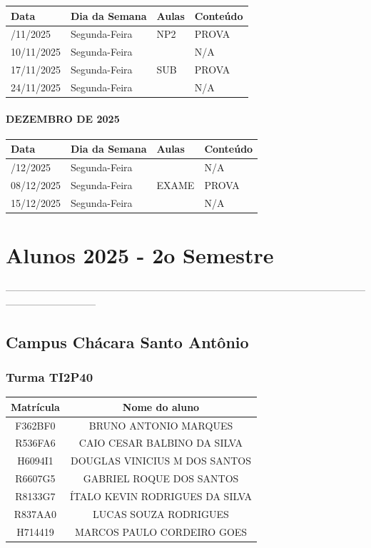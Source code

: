\documentclass[
]{book}
\begin{document}
\begin{longtable}[]{@{}llll@{}}
\toprule\noalign{}
Data & Dia da Semana & Aulas & Conteúdo \\
\midrule\noalign{}
\endhead
\bottomrule\noalign{}
\endlastfoot
03/11/2025 & Segunda-Feira & NP2 & PROVA \\
10/11/2025 & Segunda-Feira & & N/A \\
17/11/2025 & Segunda-Feira & SUB & PROVA \\
24/11/2025 & Segunda-Feira & & N/A \\
\end{longtable}

\paragraph{DEZEMBRO DE 2025}\label{dezembro-de-2025}

\begin{longtable}[]{@{}llll@{}}
\toprule\noalign{}
Data & Dia da Semana & Aulas & Conteúdo \\
\midrule\noalign{}
\endhead
\bottomrule\noalign{}
\endlastfoot
01/12/2025 & Segunda-Feira & & N/A \\
08/12/2025 & Segunda-Feira & EXAME & PROVA \\
15/12/2025 & Segunda-Feira & & N/A \\
\end{longtable}

\section{Alunos 2025 - 2o Semestre}\label{alunos-2025---2o-semestre}

---------------------------------------------------------------------------------------------------------------------------------------

\subsection{Campus Chácara Santo Antônio}\label{campus-chuxe1cara-santo-antuxf4nio}

\subsubsection{Turma TI2P40}\label{turma-ti2p40}

\begin{longtable}[]{@{}cc@{}}
\toprule\noalign{}
Matrícula & Nome do aluno \\
\midrule\noalign{}
\endhead
\bottomrule\noalign{}
\endlastfoot
F362BF0 & BRUNO ANTONIO MARQUES \\
R536FA6 & CAIO CESAR BALBINO DA SILVA \\
H6094I1 & DOUGLAS VINICIUS M DOS SANTOS \\
R6607G5 & GABRIEL ROQUE DOS SANTOS \\
R8133G7 & ÍTALO KEVIN RODRIGUES DA SILVA \\
R837AA0 & LUCAS SOUZA RODRIGUES \\
H714419 & MARCOS PAULO CORDEIRO GOES \\
\end{longtable}
\end{document}
